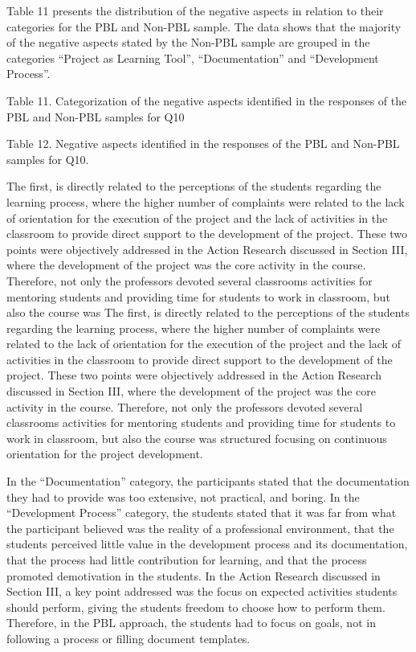 Table 11 presents the distribution of the negative aspects in relation to their categories for the PBL and Non-PBL sample. The data shows that the majority of the negative aspects stated by the Non-PBL sample are grouped in the categories “Project as Learning Tool”, “Documentation” and “Development Process”.

Table 11. Categorization of the negative aspects identified in the responses of the PBL and Non-PBL samples for Q10

Table 12. Negative aspects identified in the responses of the PBL and Non-PBL samples for Q10.

The first, is directly related to the perceptions of the students regarding the learning process, where the higher number of complaints were related to the lack of orientation for the execution of the project and the lack of activities in the classroom to provide direct support to the development of the project. These two points were objectively addressed in the Action Research discussed in Section III, where the development of the project was the core activity in the course. Therefore, not only the professors devoted several classrooms activities for mentoring students and providing time for students to work in classroom, but also the course was  The first, is directly related to the perceptions of the students regarding the learning process, where the higher number of complaints were related to the lack of orientation for the execution of the project and the lack of activities in the classroom to provide direct support to the development of the project. These two points were objectively addressed in the Action Research discussed in Section III, where the development of the project was the core activity in the course. Therefore, not only the professors devoted several classrooms activities for mentoring students and providing time for students to work in classroom, but also the course was structured focusing on continuous orientation for the project development.

In the “Documentation” category, the participants stated that the documentation they had to provide was too extensive, not practical, and boring. In the “Development Process” category, the students stated that it was far from what the participant believed was the reality of a professional environment, that the students perceived little value in the development process and its documentation, that the process had little contribution for learning, and that the process promoted demotivation in the students. In the Action Research discussed in Section III, a key point addressed was the focus on expected activities students should perform, giving the students freedom to choose how to perform them. Therefore, in the PBL approach, the students had to focus on goals, not in following a process or filling document templates.

